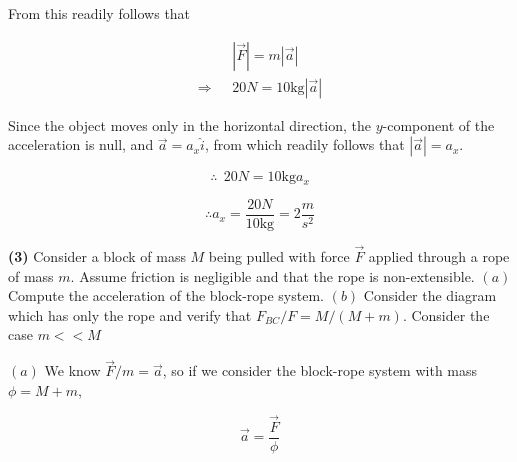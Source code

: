 \documentclass[12pt]{article}
\theoremstyle{definition}
\begin{document}
From this readily follows that 

\begin{align*}
    &\left| \vec{F} \right| = m \left| \vec{a} \right|  \\ 
    \Rightarrow ~ ~ ~ &20N = 10\text{kg} \left| \vec{a} \right| 
\end{align*}

Since the object moves only in the horizontal direction, the $y$-component of
the acceleration is null, and $\vec{a} = a_x \hat{i}$, from which readily follows
that $\left| \vec{a} \right| = a_x $.

\begin{equation*}
    \therefore ~ ~ 20N = 10\text{kg} a_x
\end{equation*}

\begin{equation*}
    \therefore a_x = \frac{20N}{10\text{kg}} = 2\frac{m}{s^2}
\end{equation*}

\pagebreak 

\begin{shaded}
    \textbf{(3)} Consider a block of mass $M$ being pulled with force $\vec{F}$
    applied through a rope of mass $m$. Assume friction is negligible and that
    the rope is non-extensible. $(a)$ Compute the acceleration of the block-rope
    system. $(b)$ Consider the diagram which has only the rope and verify that 
    $F_{BC}/F = M / (M+m)$. Consider the case $m < <  M$

\end{shaded}


$(a)$ We know $\vec{F}/m = \vec{a}$, so if we consider the block-rope system 
with mass $\phi = M + m$, 


\begin{equation}
  \vec{a} = \frac{\vec{F}}{\phi} 
\end{equation}
\end{document}
